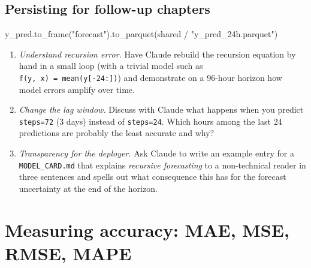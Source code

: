 \documentclass[
  english,
  letterpaper,
]{scrbook}
\newenvironment{Shaded}{\begin{snugshade}}{\end{snugshade}}
\newcommand{\NormalTok}[1]{\textcolor[rgb]{0.00,0.23,0.31}{#1}}
\newcommand{\OperatorTok}[1]{\textcolor[rgb]{0.37,0.37,0.37}{#1}}
\newcommand{\StringTok}[1]{\textcolor[rgb]{0.13,0.47,0.30}{#1}}
\providecommand{\tightlist}{%
  \setlength{\itemsep}{0pt}\setlength{\parskip}{0pt}}
\begin{document}
\section{Persisting for follow-up
chapters}\label{persisting-for-follow-up-chapters-2}

\protect{}\label{persist-pred}
\begin{Shaded}
\begin{Highlighting}[]
\NormalTok{y\_pred.to\_frame(}\StringTok{"forecast"}\NormalTok{).to\_parquet(shared }\OperatorTok{/} \StringTok{"y\_pred\_24h.parquet"}\NormalTok{)}
\end{Highlighting}
\end{Shaded}

\begin{tcolorbox}[enhanced jigsaw, arc=.35mm, bottomrule=.15mm, bottomtitle=1mm, breakable, colback=white, colbacktitle=quarto-callout-tip-color!10!white, colframe=quarto-callout-tip-color-frame, coltitle=black, left=2mm, leftrule=.75mm, opacityback=0, opacitybacktitle=0.6, rightrule=.15mm, title=\textcolor{quarto-callout-tip-color}{\faLightbulb}\hspace{0.5em}{Exercises (with Claude)}, titlerule=0mm, toprule=.15mm, toptitle=1mm]

\begin{enumerate}
\def\labelenumi{\arabic{enumi}.}
\tightlist
\item
  \emph{Understand recursion error.} Have Claude rebuild the recursion
  equation by hand in a small loop (with a trivial model such as
  \texttt{f(y,\ x)\ =\ mean(y{[}-24:{]})}) and demonstrate on a 96-hour
  horizon how model errors amplify over time.
\item
  \emph{Change the lag window.} Discuss with Claude what happens when
  you predict \texttt{steps=72} (3 days) instead of \texttt{steps=24}.
  Which hours among the last 24 predictions are probably the least
  accurate and why?
\item
  \emph{Transparency for the deployer.} Ask Claude to write an example
  entry for a \texttt{MODEL\_CARD.md} that explains \emph{recursive
  forecasting} to a non-technical reader in three sentences and spells
  out what consequence this has for the forecast uncertainty at the end
  of the horizon.
\end{enumerate}

\end{tcolorbox}


\chapter{Measuring accuracy: MAE, MSE, RMSE, MAPE}\label{sec-accuracy}
\end{document}
